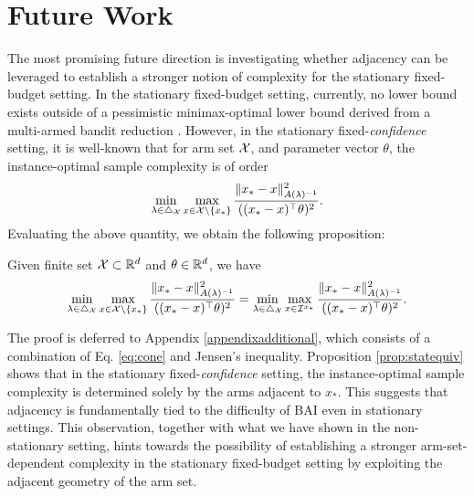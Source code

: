\section{Future Work} \label{sec:futurework}
The most promising future direction is investigating whether adjacency can be leveraged to establish a stronger notion of complexity for the stationary fixed-budget setting. In the stationary fixed-budget setting, currently, no lower bound exists outside of a pessimistic minimax-optimal lower bound derived from a multi-armed bandit reduction \citep{NEURIPS2022_4f9342b7}. However, in the stationary fixed-\textit{confidence} setting, it is well-known \citep{soare2014best,NEURIPS2019_8ba6c657,NEURIPS2020_7212a656} that for arm set $\mathcal{X}$, and parameter vector $\theta$, the instance-optimal sample complexity is of order \begin{equation}    
\min_{\lambda \in \triangle_{\mathcal{X}}} \max_{x \in \mathcal{X} \setminus \{x_*\}} \frac{\|x_* -x\|^2_{A(\lambda)^{-1}}}{((x_* - x)^\top\theta)^2}.\end{equation}
Evaluating the above quantity, we obtain the following proposition:
\begin{proposition}\label{prop:statequiv}
     Given finite set $\mathcal{X} \subset\mathbb{R}^d$ and $\theta\in\mathbb{R}^d$, we have \begin{equation}
         \min_{\lambda \in \triangle_{\mathcal{X}}} \max_{x \in \mathcal{X} \setminus \{x_*\}} \frac{\|x_* -x\|^2_{A(\lambda)^{-1}}}{((x_* - x)^\top\theta)^2} = \min_{\lambda \in \triangle_{\mathcal{X}}} \max_{x \in \mathcal{I}^{x_*}} \frac{\|x_* -x\|^2_{A(\lambda)^{-1}}}{((x_* - x)^\top\theta)^2}. \end{equation}
\end{proposition}

The proof is deferred to Appendix \ref{appendixadditional}, which consists of a combination of Eq. \eqref{eq:cone} and Jensen's inequality. Proposition \ref{prop:statequiv} shows that in the stationary fixed-\textit{confidence} setting, the instance-optimal sample complexity is determined solely by the arms adjacent to $x_*$. This suggests that adjacency is fundamentally tied to the difficulty of BAI even in stationary settings. This observation, together with what we have shown in the non-stationary setting, hints towards the possibility of establishing a stronger arm-set-dependent complexity in the stationary fixed-budget setting by exploiting the adjacent geometry of the arm set.